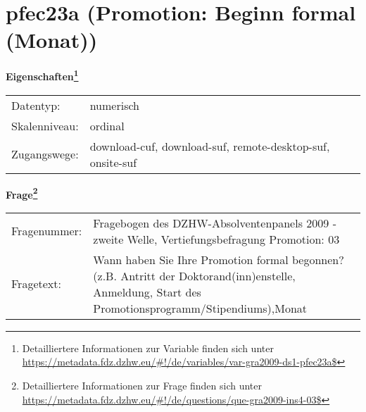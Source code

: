 
    \setcounter{footnote}{0}

    \vspace*{-1.8cm}
	\section{pfec23a (Promotion: Beginn formal (Monat))}
	\label{section:pfec23a}



    \vspace*{0.5cm}
    \noindent\textbf{Eigenschaften\footnote{Detailliertere Informationen zur Variable finden sich unter
		\url{https://metadata.fdz.dzhw.eu/\#!/de/variables/var-gra2009-ds1-pfec23a$}}}\\
	\begin{tabularx}{\hsize}{@{}lX}
	Datentyp: & numerisch \\
	Skalenniveau: & ordinal \\
	Zugangswege: &
	  download-cuf, 
	  download-suf, 
	  remote-desktop-suf, 
	  onsite-suf
 \\
    \end{tabularx}



				\vspace*{0.5cm}
                \noindent\textbf{Frage\footnote{Detailliertere Informationen zur Frage finden sich unter
		              \url{https://metadata.fdz.dzhw.eu/\#!/de/questions/que-gra2009-ins4-03$}}}\\
				\begin{tabularx}{\hsize}{@{}lX}
					Fragenummer: &
					  Fragebogen des DZHW-Absolventenpanels 2009 - zweite Welle, Vertiefungsbefragung Promotion:
					  03
 \\
					Fragetext: & Wann haben Sie Ihre Promotion formal begonnen? (z.B. Antritt der Doktorand(inn)enstelle, Anmeldung, Start des Promotionsprogramm/Stipendiums),Monat \\
				\end{tabularx}





